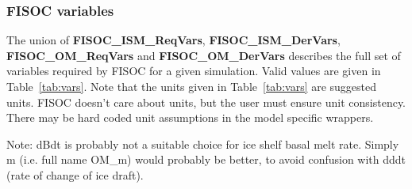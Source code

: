 \documentclass[11pt]{article}
\begin{document}
\subsubsection{FISOC variables}
\label{sec:FISOCvars}

The union of \textbf{FISOC\_ISM\_ReqVars}, \textbf{FISOC\_ISM\_DerVars}, \textbf{FISOC\_OM\_ReqVars} 
and \textbf{FISOC\_OM\_DerVars} describes the full set of variables required by FISOC for a given simulation. 
Valid values are given in Table~\ref{tab:vars}.
Note that the units given in Table~\ref{tab:vars} are suggested units.  FISOC doesn't care about units, but 
the user must ensure unit consistency.  There may be hard coded unit assumptions in the model specific 
wrappers.

Note: dBdt is probably not a suitable choice for ice shelf basal melt rate.  
Simply m (i.e. full name OM\_m) would probably be better, to avoid confusion with dddt 
(rate of change of ice draft).
\end{document}

